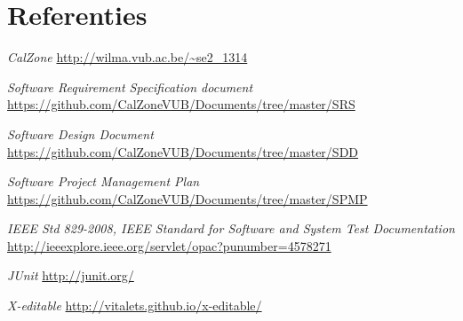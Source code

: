 \chapter{Referenties}
\begingroup
\renewcommand{\chapter}[2]{}%
\begin{thebibliography}{99}

	 \emph{CalZone} \url{http://wilma.vub.ac.be/~se2_1314}
	
     \emph{Software Requirement Specification document} \url{https://github.com/CalZoneVUB/Documents/tree/master/SRS}
    
     \emph{Software Design Document} \url{https://github.com/CalZoneVUB/Documents/tree/master/SDD}
    
     \emph{Software Project Management Plan} \url{https://github.com/CalZoneVUB/Documents/tree/master/SPMP}
    
     \emph{IEEE Std 829-2008\texttrademark \space, IEEE Standard for Software and System Test Documentation} \url{http://ieeexplore.ieee.org/servlet/opac?punumber=4578271}
    
     \emph{JUnit} \url{http://junit.org/}

	 \emph{X-editable} \url{http://vitalets.github.io/x-editable/}
\end{thebibliography}

\endgroup